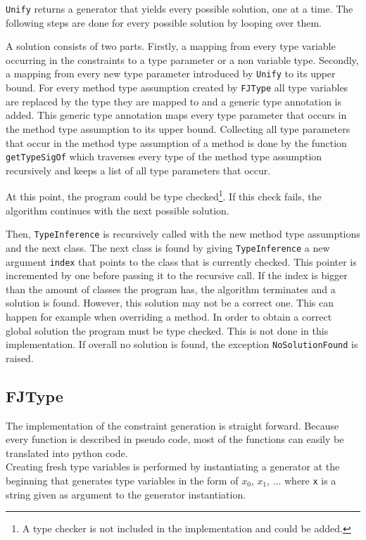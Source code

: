 \verb|Unify| returns a generator that yields every possible solution, one at a time. The following steps are done for every possible solution by looping over them.

A solution consists of two parts. Firstly, a mapping from every type variable occurring in the constraints to a type parameter or a non variable type. Secondly, a mapping from every new type parameter introduced by \verb|Unify| to its upper bound.
For every method type assumption created by \verb|FJType| all type variables are replaced by the type they are mapped to and
a generic type annotation is added. This generic type annotation maps every type parameter that occurs in the method type assumption to its upper bound.
Collecting all type parameters that occur in the method type assumption of a method is done by the function \verb|getTypeSigOf| which traverses every type of the method type assumption recursively and keeps a list of all type parameters that occur.

At this point, the program could be type checked\footnote{A type checker is not included in the implementation and could be added.}. If this check fails, the algorithm continues with the next possible solution.

Then, \verb|TypeInference| is recursively called with the new method type assumptions and the next class.
The next class is found by giving \verb|TypeInference| a new argument \verb|index| that points to the class that is currently checked. This pointer is incremented by one before passing it to the recursive call.
If the index is bigger than the amount of classes the program has, the algorithm terminates and a solution is found.
However, this solution may not be a correct one. This can happen for example when overriding a method. In order to obtain a correct global solution
the program must be type checked. This is not done in this implementation.
If overall no solution is found, the exception \verb|NoSolutionFound| is raised.

\subsection{FJType}
The implementation of the constraint generation is straight forward. Because every function is described in pseudo code, most of the functions can easily be translated into python code. \\
Creating fresh type variables is performed by instantiating a generator at the beginning that generates type variables in the form of $x_0$, $x_1$, ... where \verb|x| is a string given as argument to the generator instantiation. \\

